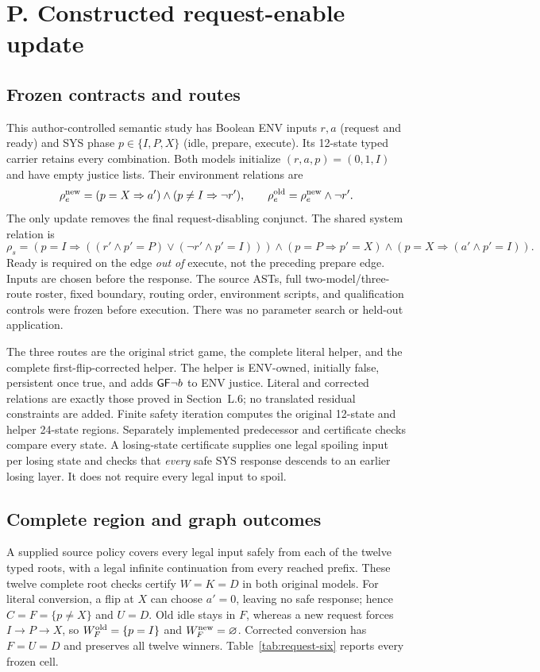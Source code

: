 \section*{P. Constructed request-enable update}
\setcounter{subsection}{0}
\renewcommand{\thesubsection}{P.\arabic{subsection}}
\renewcommand{\theHsubsection}{P.\arabic{subsection}}

\subsection{Frozen contracts and routes}
This author-controlled semantic study has Boolean ENV inputs $r,a$
(request and ready) and SYS phase $p\in\{I,P,X\}$ (idle, prepare,
execute). Its 12-state typed carrier retains every combination.
Both models initialize $(r,a,p)=(0,1,I)$ and have empty justice lists.
Their environment relations are
\[
 \rho_e^{\rm new}=(p=X\Rightarrow a')\land(p\ne I\Rightarrow\neg r'),
 \qquad \rho_e^{\rm old}=\rho_e^{\rm new}\land\neg r'.
\]
The only update removes the final request-disabling conjunct. The shared
system relation is
\[
 \rho_s=(p=I\Rightarrow ((r'\land p'=P)\lor(\neg r'\land p'=I)))
 \land(p=P\Rightarrow p'=X)
 \land(p=X\Rightarrow(a'\land p'=I)).
\]
Ready is required on the edge \emph{out of} execute, not the preceding
prepare edge. Inputs are chosen before the response. The source ASTs,
full two-model/three-route roster, fixed boundary, routing order,
environment scripts, and qualification controls were frozen before
execution. There was no parameter search or held-out application.

The three routes are the original strict game, the complete literal
helper, and the complete first-flip-corrected helper. The helper is
ENV-owned, initially false, persistent once true, and adds
$\mathsf{G}\mathsf{F}\neg b$ to ENV justice. Literal and corrected relations are exactly
those proved in Section~L.6; no translated residual constraints are
added. Finite safety iteration computes the original 12-state and
helper 24-state regions. Separately implemented predecessor and
certificate checks compare every state. A losing-state certificate
supplies one legal spoiling input per losing state and checks that
\emph{every} safe SYS response descends to an earlier losing layer.
It does not require every legal input to spoil.

\subsection{Complete region and graph outcomes}
A supplied source policy covers every legal input safely from each of
the twelve typed roots, with a legal infinite continuation from every
reached prefix. These twelve complete root checks certify $W=K=D$ in
both original models. For literal conversion, a flip at $X$ can choose
$a'=0$, leaving no safe response; hence $C=F=\{p\ne X\}$ and $U=D$.
Old idle stays in $F$, whereas a new request forces $I\to P\to X$,
so $W_F^{\rm old}=\{p=I\}$ and $W_F^{\rm new}=\varnothing$.
Corrected conversion has $F=U=D$ and preserves all twelve winners.
Table~\ref{tab:request-six} reports every frozen cell.

